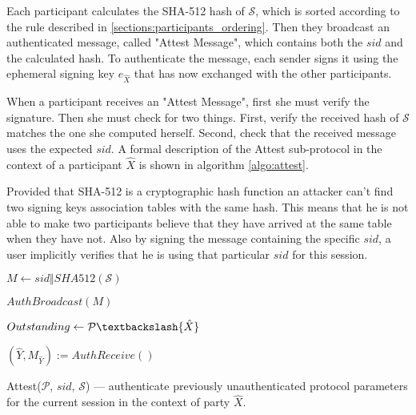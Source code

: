 Each participant calculates the SHA-512 hash of $\mathcal{S}$, which is sorted according to the rule described in \ref{sections:participants_ordering}. Then they broadcast an authenticated message, called "Attest Message", which contains both the $sid$ and the calculated hash. To authenticate the message, each sender signs it using the ephemeral signing key $e_{\hat{X}}$ that has now exchanged with the other participants.

When a participant receives an "Attest Message", first she must verify the signature. Then she must check for two things. First, verify the received hash of $\mathcal{S}$ matches the one she computed herself. Second, check that the received message uses the expected $sid$. A formal description of the Attest sub-protocol in the context of a participant $\hat{X}$ is shown in algorithm \ref{algo:attest}.

Provided that SHA-512 is a cryptographic hash function an attacker can't find two signing keys association tables with the same hash. This means that he is not able to make two participants believe that they have arrived at the same table when they have not. Also by signing the message containing the specific $sid$, a user implicitly verifies that he is using that particular $sid$ for this session.

\begin{algorithm}[H]
  \Begin
  {	
	$M \leftarrow sid \Vert SHA512(\mathcal{S})$
	
	$AuthBroadcast(M)$
	
	$Outstanding \leftarrow \mathcal{P} \textbackslash \{\hat{X}\}$

    {
      $(\hat{Y}, M_{\hat{Y}}) := AuthReceive()$
      
      {     
        
      }
    }

  }
  \caption{Attest($\mathcal{P}$, $sid$, $\mathcal{S}$) --- authenticate previously unauthenticated protocol parameters for the current session in the context of party $\hat{X}$.}
  \label{algo:attest}
\end{algorithm}

